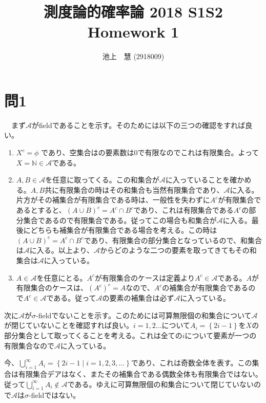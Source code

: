 \documentclass{article}
\begin{document}
\title{測度論的確率論 2018 S1S2 \\ 
Homework 1}
\author{池上　慧 (2918009)}
\maketitle

\section{問1}
　まず$\mathcal{A}$がfieldであることを示す。そのためには以下の三つの確認をすれば良い。

\begin{enumerate}
	\item $X^c = \phi$ であり、空集合はの要素数は$0$で有限なのでこれは有限集合。よって$X = \mathbb{N} \in \mathcal{A}$である。
	\item $A, B \in \mathcal{A}$を任意に取ってくる。この和集合が$\mathcal{A}$に入っていることを確かめる。$A, B$共に有限集合の時はその和集合も当然有限集合であり、$\mathcal{A}$に入る。片方がその補集合が有限集合である時は、一般性を失わずに$A^c$が有限集合であるとすると、$(A\cup B)^c = A^c \cap B^c$であり、これは有限集合である$A^c$の部分集合であるので有限集合である。従ってこの場合も和集合が$\mathcal{A}$に入る。最後にどちらも補集合が有限集合である場合を考える。この時は$(A\cup B)^c = A^c \cap B^c$であり、有限集合の部分集合となっているので、和集合は$\mathcal{A}$に入る。以上より、$\mathcal{A}$からどのような二つの要素を取ってきてもその和集合は$\mathcal{A}$に入っている。
	\item $A \in \mathcal{A}$を任意にとる。$A^c$が有限集合のケースは定義より$A^c \in \mathcal{A}$である。$A$が有限集合のケースは、$(A^c)^c = A$なので、$A^c$の補集合が有限集合であるので$A^c \in \mathcal{A}$である。従って$\mathcal{A}$の要素の補集合は必ず$\mathcal{A}$に入っている。
\end{enumerate}

次に$\mathcal{A}$が$\sigma$-fieldでないことを示す。このためには可算無限個の和集合について$\mathcal{A}$が閉じていないことを確認すれば良い。$i = 1, 2 \dots$について$A_i = \left\{2i -1\right\}$を$X$の部分集合として取ってくることを考える。これは全ての$i$について要素が一つの有限集合なので$\mathcal{A}$に入っている。

今、$\bigcup_{i = 1}^{\infty} A_i = \left\{ 2i-1 \mid i = 1,2,3, \dots \right\}$であり、これは奇数全体を表す。この集合は有限集合デアはなく、またその補集合である偶数全体も有限集合ではない。従って$\bigcup_{i = 1}^{\infty} A_i \not\in \mathcal{A}$である。ゆえに可算無限個の和集合について閉じていないので$\mathcal{A}$は$\sigma$-fieldではない。
\end{document}

